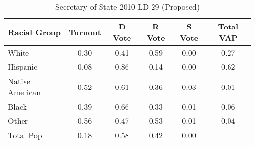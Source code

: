 \begin{table}[htb]
\begin{center}
\caption{Secretary of State 2010 LD 29 (Proposed)}
\label{sos10_vap_ld_29}
\begin{tabular}{lccccc}
  \hline
Racial Group & Turnout & D Vote & R Vote & S Vote & Total VAP \\ 
  \hline
White & 0.30 & 0.41 & 0.59 & 0.00 & 0.27 \\ 
  Hispanic & 0.08 & 0.86 & 0.14 & 0.00 & 0.62 \\ 
  Native American & 0.52 & 0.61 & 0.36 & 0.03 & 0.01 \\ 
  Black & 0.39 & 0.66 & 0.33 & 0.01 & 0.06 \\ 
  Other & 0.56 & 0.47 & 0.53 & 0.01 & 0.04 \\ 
  Total Pop & 0.18 & 0.58 & 0.42 & 0.00 &  \\ 
   \hline
\end{tabular}
\end{center}
\end{table}
